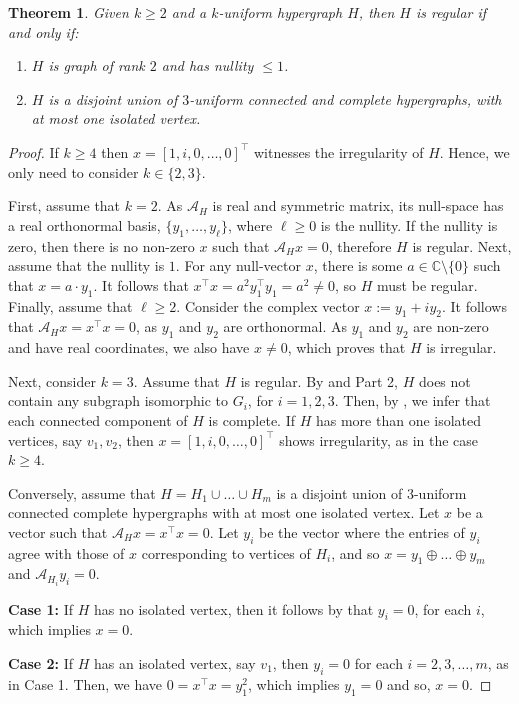 \documentclass[12pt]{article}
\numberwithin{equation}{section}
\newtheorem{theorem}{Theorem}[section]
\theoremstyle{definition}
\newcommand{\C}{\mathbb{C}}
\begin{document}
\begin{theorem} \label{thm:qi-regular}
Given $k\geq 2$ and a $k$-uniform hypergraph $H$, then $H$ is regular if and only if:
\begin{enumerate}
\item[\textit{i}] $H$ is graph of rank $2$ and has nullity $\leq 1$. 
\item[\textit{ii}] $H$ is a disjoint union of $3$-uniform connected and complete hypergraphs, with at most one isolated vertex. 
\end{enumerate} 
\end{theorem}
\begin{proof}
If $k \geq 4$ then $x = [1,i,0,\ldots,0]^\top$ witnesses the irregularity of $H$. Hence, we only need to consider $k\in \{2,3\}$.

First, assume that $k=2$. As $\mathcal{A}_H$ is real and symmetric matrix, its null-space has a real orthonormal basis, $\{y_1,\ldots,y_\ell\}$, where $\ell \geq 0$ is the nullity. If the nullity is zero, then there is no non-zero $x$ such that $\mathcal{A}_H x = 0$, therefore $H$ is regular. Next, assume that the nullity is $1$. For any null-vector $x$, there is some $a\in \C \setminus \{0\}$ such that $x = a\cdot y_1$. It follows that $x^\top x = a^2 y_1^\top y_1 = a^2 \neq 0 $, so $H$ must be regular. Finally, assume that $\ell \geq 2$. Consider the complex vector $x := y_1 + i y_2$. It follows that $\mathcal{A}_H x = x^\top x = 0$, as $y_1$ and $y_2$ are orthonormal. As $y_1$ and $y_2$ are non-zero and have real coordinates, we also have $x \neq 0$, which proves that $H$ is irregular.

Next, consider $k = 3$. Assume that $H$ is regular. By  and  Part 2, $H$ does not contain any subgraph isomorphic to $G_i$, for $i=1,2,3$. Then, by , we infer that each connected component of $H$ is complete. If $H$ has more than one isolated vertices, say $v_1,v_2$, then $x = [1,i,0,\ldots,0]^\top$ shows irregularity, as in the case $k\geq 4$.

Conversely, assume that $H = H_1 \cup \ldots \cup H_m$ is a disjoint union of $3$-uniform connected complete hypergraphs with at most one isolated vertex. Let $x$ be a vector such that $\mathcal{A}_H x = x^\top x = 0$. Let $y_i$ be the vector where the entries of $y_i$ agree with those of $x$ corresponding to vertices of $H_i$, and so $x = y_1 \oplus \ldots \oplus y_m$ and $\mathcal{A}_{H_i} y_i = 0$. 

\textbf{Case 1:} If $H$ has no isolated vertex, then it follows by  that $y_i=0$, for each $i$, which implies $x=0$. 

\textbf{Case 2:} If $H$ has an isolated vertex, say $v_1$, then $y_i = 0$ for each $i = 2,3,\ldots, m$, as in Case 1. Then, we have $0 = x^\top x = y_1^2$, which implies $y_1=0$ and so, $x=0$. 
\end{proof}
\end{document}
